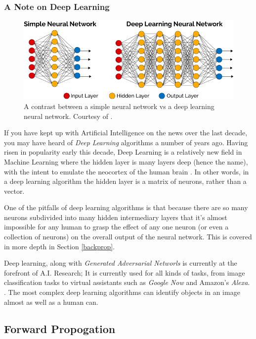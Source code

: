\documentclass[12pt]{article}
\begin{document}
\subsubsection{A Note on Deep Learning}

\begin{figure}[h]
  \centering
  \includegraphics[width=\textwidth]{DeepLearning-diagram.png}
  \caption{A contrast between a simple neural network vs a deep learning neural network. Courtesy of \textcite{vazquez17}. \label{deeplearningfig}}
\end{figure}

If you have kept up with Artificial Intelligence on the news over the last decade, you may have heard of \textit{Deep Learning} algorithms a number of years ago. Having risen in popularity early this decade, Deep Learning is a relatively new field in Machine Learning where the hidden layer is many layers deep (hence the name), with the intent to emulate the neocortex of the human brain \textcite{Hof2013}. In other words, in a deep learning algorithm the hidden layer is a matrix of neurons, rather than a vector.

One of the pitfalls of deep learning algorithms is that because there are so many neurons subdivided into many hidden intermediary layers that it's almost impossible for any human to grasp the effect of any one neuron (or even a collection of neurons) on the overall output of the neural network. This is covered in more depth in Section \ref{backprop}.

Deep learning, along with \textit{Generated Adversarial Networls} is currently at the forefront of A.I. Research; It is currently used for all kinds of tasks, from image classification tasks to virtual assistants such as \textit{Google Now} and Amazon's \textit{Alexa}. \textcite{vazquez17}. The most complex deep learning algorithms can identify objects in an image almost as well as a human can.

\subsection{Forward Propogation \label{foreprop}}
\end{document}
